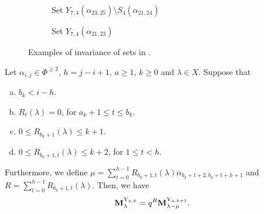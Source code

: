 \begin{example}
\begin{figure}[H]
        \centering
        \begin{subfigure}[t]{0.48\textwidth}
        \caption{Set $Y_{7,4}(\alpha_{23,25})\setminus S_{4}(\alpha_{21,24})$}
        \label{fig: bk<i-1}
        \end{subfigure}
        \begin{subfigure}[t]{0.48\textwidth}
        \caption{Set  $Y_{7,4}(\alpha_{21,23})$}
        \label{fig: bk=i-1}
        \end{subfigure}
        \caption{Examples of invariance of sets in . }
    \end{figure}


    
\end{example}

\begin{lemma}\label{lem: third string lemma}  
Let  $\alpha_{i,j} \in \Phi^{\geq 2}$, $h=j-i+1$, $a\geq 1$, $k\geq 0$ and $\lambda \in X$. 
Suppose that 
\begin{enumerate}[(a)]
\item $b_{k}<i-h$. \label{itemA}  
\item $R_{t}(\lambda)=0$, for $a_{k}+1\leq t \leq b_{k}$. \label{itemB}
\item $ 0\leq R_{b_k+1}(\lambda) \leq k+1$. \label{itemC}
\item $0\leq R_{b_{k}+1,t}(\lambda) \leq k+2$, for  $1\leq t<h$.   \label{itemD}
\end{enumerate}
Furthermore, we define
$\displaystyle \mu =\sum_{t=0}^{h-1} R_{b_{k}+1,t}(\lambda )  \alpha_{b_{k}+t+2,b_{k}+t+h+1}$ and 
$\displaystyle R=\sum_{t=0}^{h-1} R_{b_{k}+1,t} (\lambda )$.
Then, we have 
\begin{equation}
    \mathbf{M}_{\lambda}^{\mathrm{Y}_{a,k}} = q^{R}\mathbf{M}_{\lambda - \mu}^{ \mathrm{Y}_{a,k+1}}.
    \end{equation}
\end{lemma}




